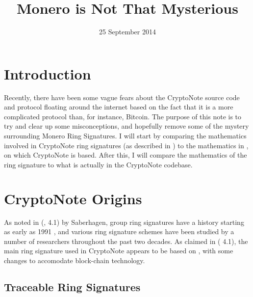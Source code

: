 \documentclass[12pt,english]{mrl}
\numberwithin{equation}{section}
\numberwithin{figure}{section}
\begin{document}
\begin{frontmatter}

\begin{fmbox}
\hfill\setlength{\fboxrule}{0px}\setlength{\fboxsep}{5px}
\title{Monero is Not That Mysterious}
\date{25 September 2014}
\author[
   addressref={mrl},
   email={lab@monero.cc}
]{ }


\address[id=mrl]{
}
\end{fmbox}



\end{frontmatter}

\section{Introduction}
Recently, there have been some vague fears about the CryptoNote
source code and protocol floating around the internet based on the
fact that it is a more complicated protocol than, for instance, Bitcoin.
The purpose of this note is to try and clear up some misconceptions,
and hopefully remove some of the mystery surrounding Monero Ring Signatures.
I will start by comparing the mathematics involved in CryptoNote
ring signatures (as described in \cite{CN}) to the mathematics in
\cite{FS}, on which CryptoNote is based. After this, I will compare
the mathematics of the ring signature to what is actually in the
CryptoNote codebase. 


\section{CryptoNote Origins}

As noted in (\cite{CN}, 4.1) by Saberhagen, group ring signatures have a history
starting as early as 1991 \cite{CH}, and various ring signature
schemes have been studied by a number of researchers throughout the
past two decades. As claimed in (\cite{CN} 4.1), the main ring signature
used in CryptoNote appears to be based on \cite{FS}, with some changes
to accomodate block-chain technology. 


\subsection{Traceable Ring Signatures}
\end{document}
